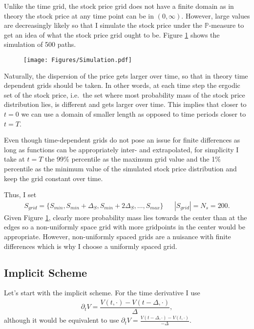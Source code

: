 \documentclass[11pt,a4paper]{article}
\begin{document}
Unlike the time grid, the stock price grid does not have a finite domain as in theory the stock price at any time point can be in $(0,\infty)$. However, large values are decreasingly likely so that I simulate the stock price under the $\mathbb{P}$-measure to get an idea of what the stock price grid ought to be. Figure \ref{Fig:Simulation} shows the simulation of 500 paths.
\begin{figure}[htpb]
\caption{} 
\centering
\texttt{[image: Figures/Simulation.pdf]} \label{Fig:Simulation}
\end{figure}
Naturally, the dispersion of the price gets larger over time, so that in theory time dependent grids should be taken. In other words, at each time step the ergodic set of the stock price, i.e.\ the set where most probability mass of the stock price distribution lies, is different and gets larger over time. This implies that closer to $t=0$ we can use a domain of smaller length as opposed to time periods closer to $t=T$. 

Even though time-dependent grids do not pose an issue for finite differences as long as functions can be appropriately inter- and extrapolated, for simplicity I take at $t=T$ the 99\% percentile as the maximum grid value and the 1\% percentile as the minimum value of the simulated stock price distribution and keep the grid constant over time.

Thus, I set
\begin{align*}
S_{grid} = \{S_{min},S_{min} + \Delta_S, S_{min} + 2\Delta_S,\ldots,S_{max}\} && |S_{grid}| = N_s = 200.
\end{align*}
Given Figure \ref{Fig:Simulation}, clearly more probability mass lies towards the center than at the edges so a non-uniformly space grid with more gridpoints in the center would be appropriate. However, non-uniformly spaced grids are a nuisance with finite differences which is why I choose a uniformly spaced grid. 

\subsection{Implicit Scheme}
Let's start with the implicit scheme. For the time derivative I use
\begin{align*}
\partial_tV = \dfrac{V(t,\cdot)-V(t-\Delta,\cdot)}{\Delta},
\end{align*}
although it would be equivalent to use $\partial_tV = \frac{V(t-\Delta,\cdot)-V(t,\cdot)}{-\Delta}$. 
\end{document}
